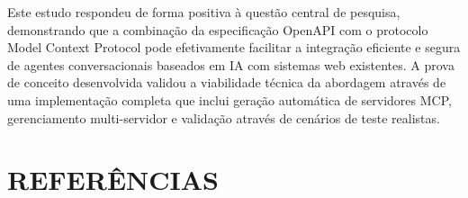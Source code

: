 \documentclass[
]{article}
\begin{document}
Este estudo respondeu de forma positiva à questão central de pesquisa,
demonstrando que a combinação da especificação OpenAPI com o protocolo
Model Context Protocol pode efetivamente facilitar a integração
eficiente e segura de agentes conversacionais baseados em IA com
sistemas web existentes. A prova de conceito desenvolvida validou a
viabilidade técnica da abordagem através de uma implementação completa
que inclui geração automática de servidores MCP, gerenciamento
multi-servidor e validação através de cenários de teste realistas.

\section*{REFERÊNCIAS}\label{referuxeancias}
\end{document}
